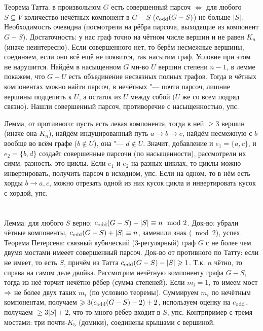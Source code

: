 \section{} %
	Теорема Татта: в произвольном $G$ есть совершенный парсоч $\iff$ для любого $S \subseteq V$
	количество нечётных компонент в $G-S$ ($c_{\mathrm{odd}}(G-S)$) не больше $|S|$.
	Необходимость очевидна (посмотрели на рёбра парсоча, выходящие из компонент $G-S$).
	Достаточность: у нас граф точно на чётном числе вершин и не равен $K_n$ (иначе неинтересно).
	Если совершенного нет, то берём несмежные вершины, соединяем, если оно всё ещё не появится, так насытим граф.
	Условие при этом не нарушится.
	Найдём в насыщенном $G$ мн-во $U$ вершин степени $n-1$, в лемме покажем, что $G-U$ есть объединение несвязных полных графов.
	Тогда в чётных компонентах можно найти парсоч, в нечётных "--- почти парсоч, лишние вершины подцепить к $U$, а остаток из $U$ между собой ($U$ же со всем подряд связно).
	Нашли совершенный парсоч, противоречие с насыщенностью, упс.

	Лемма, от противного: пусть есть левая компонента, тогда в ней $\ge 3$ вершин (иначе она $K_n$),
	найдём индуцированный путь $a \to b \to c$, найдём несмежную с $b$ вообще во всём графе ($b \notin U$), она "--- $d \notin U$.
	Значит, добавление и $e_1=\{a, c\}$, и $e_2=\{b, d\}$ создаёт совершенные парсочи (по насыщенности), рассмотрели их симм. разность, это циклы.
	Если $e_1$ и $e_2$ на разных циклах, то циклы можно инвертировать, получить парсоч в исходном, упс.
	Если на одном, то в нём есть хорды $b \to a, c$, можно отрезать одной из них кусок цикла и инвертировать кусок с хордой, упс.

\section{} %
	Лемма: для любого $S$ верно: $c_{\mathrm{odd}}(G-S)-|S|\equiv n \mod 2$.
	Док-во: убрали чётные компоненты, $c_{\mathrm{odd}}(G-S)+|S|\equiv n$, заменили знак ($\bmod 2$), успех.
	Теорема Петерсена: связный кубический (3-регулярный) граф $G$ с не более чем двумя мостами имееет совершенный парсоч.
	Док-во от противного по Татту: если не имеет, то есть $S$, причём из Татта $c_{\mathrm{odd}}(G-S) - |S|\geqslant 1$.
	Т.к. $n$ чётно, то справа на самом деле двойка.
	Рассмотрим нечётную компоненту графа $G-S$, тогда из неё торчит нечётно рёбер (сумма степеней).
	Если $m_i=1$, то имеем мост $\Rightarrow$ не более двух таких $m_i$ (по условию теоремы).
	Суммируем $m_i$ по нечётным компонентам, получаем $\geqslant 3(c_{\mathrm{odd}}(G-S)-2)+2$, используем оценку на $c_{\mathrm{odd}}$,
	получаем $\ge 3|S|+2$, что-то много рёбер входит в $S$, упс.
	Контрпример с тремя мостами: три почти-$K_5$ (домики), соединены крышами с вершиной.

